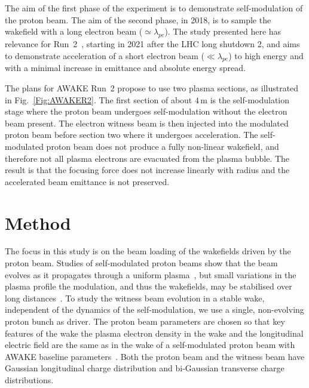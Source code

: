 \documentclass[aps,prstab,reprint,amsmath,amssymb,groupedaddress]{revtex4-1}
\newcommand{\unit}[1]{\,\mathrm{#1}}
\begin{document}
The aim of the first phase of the experiment is to demonstrate self-modulation of the proton beam. The aim of the second phase, in 2018, is to sample the wakefield with a long electron beam ($\simeq\lambda_{pe}$). The study presented here has relevance for Run~2~\cite{adli:2016}, starting in 2021 after the LHC long shutdown 2, and aims to demonstrate acceleration of a short electron beam ($\ll\lambda_{pe}$) to high energy and with a minimal increase in emittance and absolute energy spread.

The plans for AWAKE Run~2 propose to use two plasma sections, as illustrated in Fig.~\ref{Fig:AWAKER2}. The first section of about $4\unit{m}$ is the self-modulation stage where the proton beam undergoes self-modulation without the electron beam present. The electron witness beam is then injected into the modulated proton beam before section two where it undergoes acceleration. The self-modulated proton beam does not produce a fully non-linear wakefield, and therefore not all plasma electrons are evacuated from the plasma bubble. The result is that the focusing force does not increase linearly with radius and the accelerated beam emittance is not preserved. 

\section[\label{S:M}]{Method}

The focus in this study is on the beam loading of the wakefields driven by the proton beam. Studies of self-modulated proton beams show that the beam evolves as it propagates through a uniform plasma~\cite{lotov:2011}, but small variations in the plasma profile the modulation, and thus the wakefields, may be stabilised over long distances~\cite{lotov:2011, lotov:2015, caldwell:2011}. To study the witness beam evolution in a stable wake, independent of the dynamics of the self-modulation, we use a single, non-evolving proton bunch as driver. The proton beam parameters are chosen so that key features of the wake \textendash the plasma electron density in the wake and the longitudinal electric field \textendash are the same as in the wake of a self-modulated proton beam with AWAKE baseline parameters~\cite{gschwendtner:2016}. Both the proton beam and the witness beam have Gaussian longitudinal charge distribution and bi-Gaussian transverse charge distributions.
\end{document}
